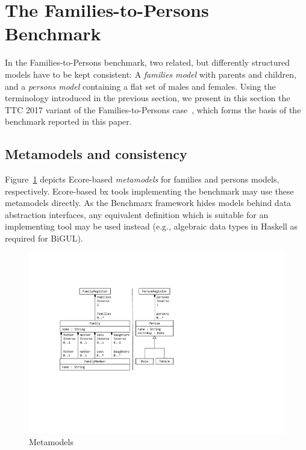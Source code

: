 

\section{The Families-to-Persons Benchmark}
\label{sec:FamiliesToPersons}



In the Families-to-Persons benchmark, two related, but differently structured models have to be kept consistent: A \emph{families model} with parents and children, and a \emph{persons model} containing a flat set of males and females. 
Using the terminology introduced in the previous section, we present in this section the TTC 2017 variant of the Families-to-Persons case~\cite{Anjorin2017a,ENASE2018-Westfechtel}, which forms the basis of the benchmark reported in this paper. 

\subsection{Metamodels and consistency}
\label{sec:MetamodelsAndConsistency}

Figure~\ref{fig:metamodels} depicts Ecore-based \emph{metamodels} for families and persons models, respectively.
Ecore-based bx tools implementing the benchmark may use these metamodels directly.
As the Benchmarx framework hides models behind data abstraction interfaces, any equivalent definition which is suitable for an implementing tool may be used instead (e.g., algebraic data types in Haskell as required for BiGUL).

\begin{figure}[tb!]
	\centering
	\includegraphics[width=\columnwidth]{diagrams/f2p-case/Metamodels}
	\caption{Metamodels}
	\label{fig:metamodels}
\end{figure}

